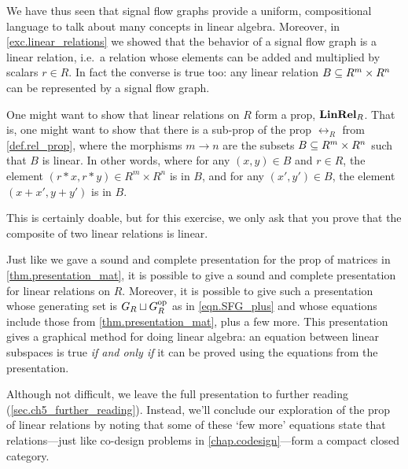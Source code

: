 \documentclass[7Sketches]{subfiles}
\begin{document}
We have thus seen that signal flow graphs provide a uniform, compositional
language to talk about many concepts in linear algebra. Moreover, in \cref{exc.linear_relations} we showed that the behavior of a signal flow graph is a linear relation, i.e.\ a relation whose elements can be added and multiplied by scalars $r\in R$. In fact the converse is true too: any linear relation $B\ss R^m\times R^n$ can be represented by a signal flow graph.%
%


\begin{exercise}%
\label{exc.linrel_prop}
One might want to show that linear relations on $R$ form a prop, $\Cat{LinRel}_R$. That is, one might want to show that there is a sub-prop of the prop $\rel_R$ from \cref{def.rel_prop}, where the morphisms $m\to n$ are the subsets $B\ss R^m\times R^n$ such that $B$ is linear. In other words, where for any $(x,y)\in B$ and $r\in R$, the element $(r*x,r*y)\in R^m\times R^n$ is in $B$, and for any $(x',y')\in B$, the element $(x+x',y+y')$ is in $B$.

This is certainly doable, but for this exercise, we only ask that you prove that the composite of two linear relations is linear.
\end{exercise}

Just like we gave a sound and complete presentation for the prop of matrices in
\cref{thm.presentation_mat}, it is possible to give a sound and complete
presentation for linear relations on $R$. Moreover, it is possible to give such
a presentation whose generating set is $G_R\sqcup G_R\op$ as in
\cref{eqn.SFG_plus} and whose equations include those from
\cref{thm.presentation_mat}, plus a few more. This presentation gives a
graphical method for doing linear algebra: an equation between linear subspaces
is true \emph{if and only if} it can be proved using the equations from the
presentation.

Although not difficult, we leave the full presentation to further reading
(\cref{sec.ch5_further_reading}). Instead, we'll conclude our exploration of the
prop of linear relations by noting that some of these `few more' equations state
that relations---just like co-design problems in \cref{chap.codesign}---form a
compact closed category.
\end{document}
